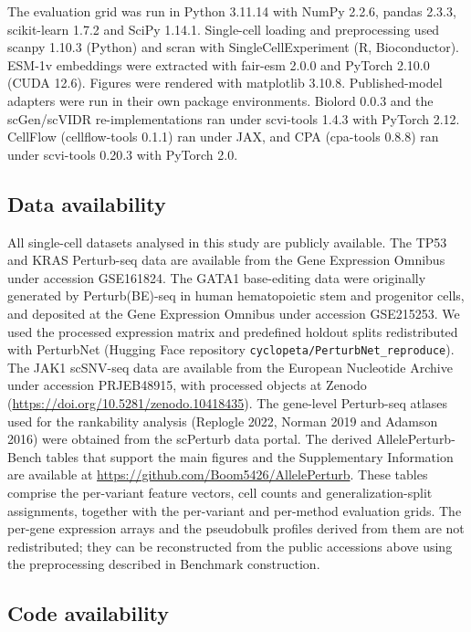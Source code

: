 \documentclass[11pt,letterpaper]{article}
\begin{document}
The evaluation grid was run in Python 3.11.14 with NumPy 2.2.6, pandas 2.3.3, scikit-learn 1.7.2 and SciPy 1.14.1. Single-cell loading and preprocessing used scanpy 1.10.3 (Python) and scran with SingleCellExperiment (R, Bioconductor). ESM-1v embeddings were extracted with fair-esm 2.0.0 and PyTorch 2.10.0 (CUDA 12.6). Figures were rendered with matplotlib 3.10.8. Published-model adapters were run in their own package environments. Biolord 0.0.3 and the scGen/scVIDR re-implementations ran under scvi-tools 1.4.3 with PyTorch 2.12. CellFlow (cellflow-tools 0.1.1) ran under JAX, and CPA (cpa-tools 0.8.8) ran under scvi-tools 0.20.3 with PyTorch 2.0.


\subsection*{Data availability}

All single-cell datasets analysed in this study are publicly available. The TP53 and KRAS Perturb-seq data are available from the Gene Expression Omnibus under accession GSE161824\cite{Ursu2022}. The GATA1 base-editing data were originally generated by Perturb(BE)-seq in human hematopoietic stem and progenitor cells, and deposited at the Gene Expression Omnibus under accession GSE215253\cite{MartinRufino2023}. We used the processed expression matrix and predefined holdout splits redistributed with PerturbNet (Hugging Face repository \texttt{cyclopeta/PerturbNet\_reproduce})\cite{PerturbNet}. The JAK1 scSNV-seq data are available from the European Nucleotide Archive under accession PRJEB48915, with processed objects at Zenodo (\url{https://doi.org/10.5281/zenodo.10418435})\cite{Cooper2024}. The gene-level Perturb-seq atlases used for the rankability analysis (Replogle 2022, Norman 2019 and Adamson 2016) were obtained from the scPerturb data portal\cite{scPerturb}. The derived AllelePerturb-Bench tables that support the main figures and the Supplementary Information are available at \url{https://github.com/Boom5426/AllelePerturb}. These tables comprise the per-variant feature vectors, cell counts and generalization-split assignments, together with the per-variant and per-method evaluation grids. The per-gene expression arrays and the pseudobulk profiles derived from them are not redistributed; they can be reconstructed from the public accessions above using the preprocessing described in Benchmark construction.

\subsection*{Code availability}
\end{document}
